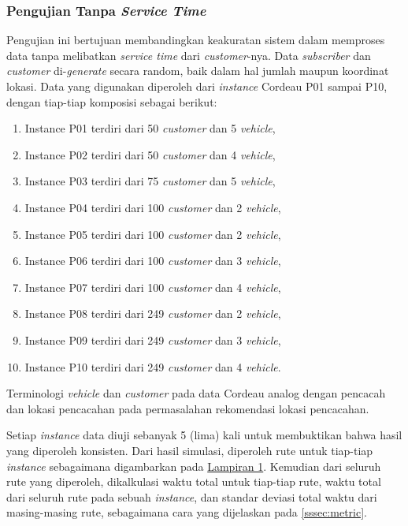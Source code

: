 \subsubsection{Pengujian Tanpa \textit{Service Time}}
\label{sssec:test-no-service-time}
Pengujian ini bertujuan membandingkan keakuratan sistem dalam memproses data tanpa melibatkan \textit{service time} dari \textit{customer}-nya. Data \textit{subscriber} dan \textit{customer} di-\textit{generate} secara random, baik dalam hal jumlah maupun koordinat lokasi. Data yang digunakan diperoleh dari \textit{instance} Cordeau P01 sampai P10, dengan tiap-tiap komposisi sebagai berikut:


\begin{enumerate}
	\item Instance P01 terdiri dari 50 \textit{customer} dan 5 \textit{vehicle},
	\item Instance P02 terdiri dari 50 \textit{customer} dan 4 \textit{vehicle}, 
	\item Instance P03 terdiri dari 75 \textit{customer} dan 5 \textit{vehicle}, 
	\item Instance P04 terdiri dari 100 \textit{customer} dan 2 \textit{vehicle}, 
	\item Instance P05 terdiri dari 100 \textit{customer} dan 2 \textit{vehicle}, 
	\item Instance P06 terdiri dari 100 \textit{customer} dan 3 \textit{vehicle}, 
	\item Instance P07 terdiri dari 100 \textit{customer} dan 4 \textit{vehicle}, 
	\item Instance P08 terdiri dari 249 \textit{customer} dan 2 \textit{vehicle}, 
	\item Instance P09 terdiri dari 249 \textit{customer} dan 3 \textit{vehicle}, 
	\item Instance P10 terdiri dari 249 \textit{customer} dan 4 \textit{vehicle}.
\end{enumerate}
Terminologi \textit{vehicle} dan \textit{customer} pada data Cordeau analog dengan pencacah dan lokasi pencacahan pada permasalahan rekomendasi lokasi pencacahan.


Setiap \textit{instance} data diuji sebanyak 5 (lima) kali untuk membuktikan bahwa hasil yang diperoleh konsisten. Dari hasil simulasi, diperoleh rute untuk tiap-tiap \textit{instance} sebagaimana digambarkan pada \hyperref[ch:test_result_cordeau_notw]{Lampiran 1}. Kemudian dari seluruh rute yang diperoleh, dikalkulasi waktu total untuk tiap-tiap rute, waktu total dari seluruh rute pada sebuah \textit{instance}, dan standar deviasi total waktu dari masing-masing rute, sebagaimana cara yang dijelaskan pada \autoref{sssec:metric}. 

